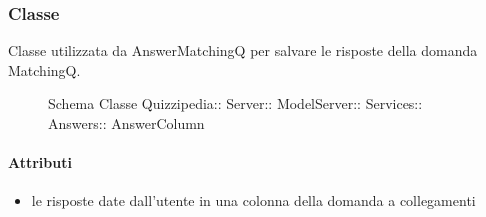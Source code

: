 \subsubsection{Classe }
Classe utilizzata da AnswerMatchingQ per salvare le risposte della domanda MatchingQ.
\begin{figure}[H]
\centering
\noindent{}
\caption[Schema Classe AnswerColumn]{Schema Classe Quizzipedia:: Server:: ModelServer:: Services:: Answers:: AnswerColumn}
\end{figure}
\paragraph{Attributi}
\begin{itemize}
\item {}
\newline
le risposte date dall'utente in una colonna della domanda a collegamenti
\end{itemize}
